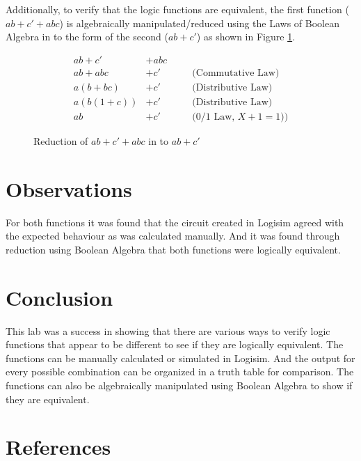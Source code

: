 \documentclass[12pt]{article}
\begin{document}
Additionally, to verify that the logic functions are equivalent,
the first function ($a b + c' + a b c$) is algebraically manipulated/reduced
using the Laws of Boolean Algebra \cite[Pg. 55]{roth2009fundamentals}
in to the form of the second ($a b + c'$) as shown in Figure \ref{fig:red}.

\begin{figure}
\begin{align*}
a b + c' &+ abc 	&& \\
a b + abc &+ c' 	&& \quad \mbox{(Commutative Law)} \\
a (b + bc) &+ c' 	&& \quad \mbox{(Distributive Law)} \\
a (b (1 + c)) &+ c' && \quad \mbox{(Distributive Law)} \\
a b &+ c' 			&& \quad \mbox{($0/1$ Law, $X + 1 = 1$))}
\end{align*}

\caption{Reduction of $ab + c' + abc$ in to $ab + c'$}
\label{fig:red}
\end{figure}

\section{Observations}

For both functions it was found that the circuit created in Logisim
agreed with the expected behaviour as was calculated manually.
And it was found through reduction using Boolean Algebra that
both functions were logically equivalent.


\section{Conclusion}

This lab was a success in showing that there are various ways to
verify logic functions that appear to be different to see if they
are logically equivalent.
The functions can be manually calculated or simulated in Logisim.
And the output for every possible combination can be organized
in a truth table for comparison.
The functions can also be algebraically manipulated using Boolean Algebra
to show if they are equivalent.


\renewcommand*{\refname}{\vspace{-8mm}}
\section{References}
%
%



\end{document}

